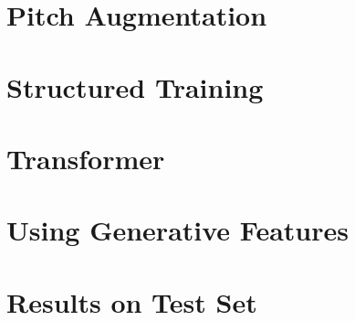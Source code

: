 \section{Pitch Augmentation}

\section{Structured Training}

\section{Transformer}

\section{Using Generative Features}

\section{Results on Test Set}